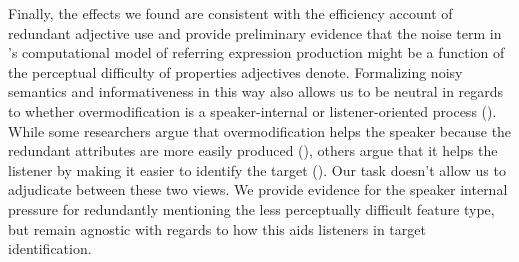 \documentclass[12pt,letterpaper]{article}
\begin{document}
Finally, the effects we found are consistent with the efficiency account of redundant adjective use and provide preliminary evidence that the noise term in \citet{DegenEtAl2020}'s computational model of referring expression production might be a function of the perceptual difficulty of properties adjectives denote. Formalizing noisy semantics and informativeness in this way also allows us to be neutral in regards to whether overmodification is a speaker-internal or listener-oriented process (\citealt{Arnold2008}). While some researchers argue that overmodification helps the speaker because the redundant attributes are more easily produced (\citealt{DaviesKatsos2013, KoolenEtAl2013}), others argue that it helps the listener by making it easier to identify the target (\citealt{FussellKraus1989a, ArtsEtAl2011,RubioFernandez2016}). Our task doesn't allow us to adjudicate between these two views. We provide evidence for the speaker internal pressure for redundantly mentioning the less perceptually difficult feature type, but remain agnostic with regards to how this aids listeners in target identification.

\end{document}
